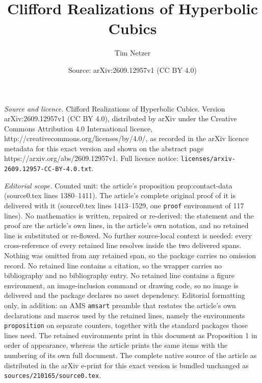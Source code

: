 \documentclass[10pt,a4paper]{amsart}
\title{Clifford Realizations of Hyperbolic Cubics}
\author{Tim Netzer}
\date{Source: arXiv:2609.12957v1 (CC BY 4.0)}
\begin{document}
\maketitle

\noindent\emph{Source and licence.} Clifford Realizations of Hyperbolic Cubics. Version arXiv:2609.12957v1 (CC BY 4.0), distributed by arXiv under the Creative Commons Attribution 4.0 International licence, http://creativecommons.org/licenses/by/4.0/, as recorded in the arXiv licence metadata for this exact version and shown on the abstract page https://arxiv.org/abs/2609.12957v1. Full licence notice: \texttt{licenses/arxiv-2609.12957-CC-BY-4.0.txt}.\par\smallskip

\noindent\textit{Editorial scope.} Counted unit: the article's proposition prop:contact-data (source0.tex lines 1380--1411). The article's complete original proof of it is delivered with it (source0.tex lines 1413--1529, one \texttt{proof} environment of 117 lines). No mathematics is written, repaired or re-derived: the statement and the proof are the article's own lines, in the article's own notation, and no retained line is substituted or re-flowed.  No further source-local context is needed: every cross-reference of every retained line resolves inside the two delivered spans.  Nothing was omitted from any retained span, so the package carries no omission record.  No retained line contains a citation, so the wrapper carries no bibliography and no bibliography entry.  No retained line contains a figure environment, an image-inclusion command or drawing code, so no image is delivered and the package declares no asset dependency.  Editorial formatting only, in addition: an AMS \texttt{amsart} preamble that restates the article's own declarations and macros used by the retained lines, namely the environments \texttt{proposition} on separate counters, together with the standard packages those lines need.  The retained environments print in this document as Proposition 1 in order of appearance, whereas the article prints the same items with the numbering of its own full document.  The complete native source of the article as distributed in the arXiv e-print for this exact version is bundled unchanged as \texttt{sources/210165/source0.tex}.
\end{document}
